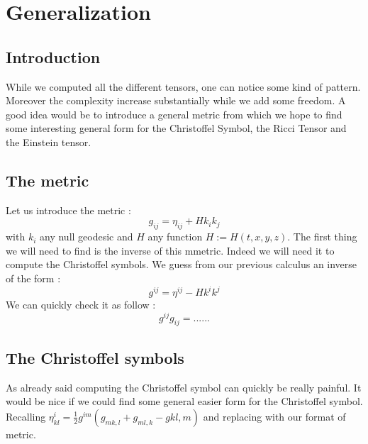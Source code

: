 \documentclass{article}
\begin{document}
\section{Generalization}
    \subsection{Introduction}
        While we computed all the different tensors, one can notice some kind of pattern.
        Moreover the complexity increase substantially while we add some freedom.
        A good idea would be to introduce a general metric from which we hope to find some interesting general form for the Christoffel Symbol, the Ricci Tensor and the Einstein tensor.
    \subsection{The metric}
        Let us introduce the metric :
        \begin{equation}
            g_{ij}=\eta_{ij}+Hk_ik_j
        \end{equation}
        with $k_i$ any null geodesic and $H$ any function $H:=H(t,x,y,z)$.
        The first thing we will need to find is the inverse of this mmetric.
        Indeed we will need it to compute the Christoffel symbols.
        We guess from our previous calculus an inverse of the form :
        \begin{equation}
            g^{ij}=\eta^{ij}-Hk^ik^j
        \end{equation}
        We can quickly check it as follow :
        \begin{equation*}
            g^{ij}g_{ij}= ...
            ...
        \end{equation*}
    \subsection{The Christoffel symbols}
        As already said computing the Christoffel symbol can quickly be really painful.
        It would be nice if we could find some general easier form for the Christoffel symbol.
        Recalling $\eta^i_{kl}=\frac{1}{2}g^{im}(g_{mk,l}+g_{ml,k}-g{kl,m})$ and replacing with our format of metric.
\end{document}
